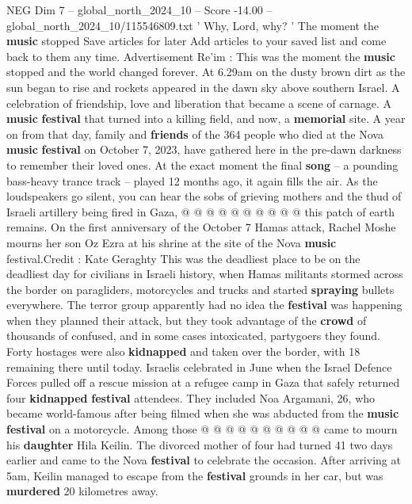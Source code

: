 \begin{textsample}{NEG Dim 7 – global\_north\_2024\_10 – Score -14.00 – global\_north\_2024\_10/115546809.txt}  \label{ex:f7_neg_031}
' Why, Lord, why? ' The moment the \textbf{music} stopped Save articles for later Add articles to your saved list and come back to them any time.
Advertisement Re'im : This was the moment the \textbf{music} stopped and the world changed forever.
At 6.29am on the dusty brown dirt as the sun began to rise and rockets appeared in the dawn sky above southern Israel.
A celebration of friendship, love and liberation that became a scene of carnage.
A \textbf{music} \textbf{festival} that turned into a killing field, and now, a \textbf{memorial} site.
A year on from that day, family and \textbf{friends} of the 364 people who died at the Nova \textbf{music} \textbf{festival} on October 7, 2023, have gathered here in the pre-dawn darkness to remember their loved ones.
At the exact moment the final \textbf{song} -- a pounding bass-heavy trance track -- played 12 months ago, it again fills the air.
As the loudspeakers go silent, you can hear the sobs of grieving mothers and the thud of Israeli artillery being fired in Gaza, @ @ @ @ @ @ @ @ @ @ this patch of earth remains.
On the first anniversary of the October 7 Hamas attack, Rachel Moshe mourns her son Oz Ezra at his shrine at the site of the Nova \textbf{music} festival.Credit : Kate Geraghty This was the deadliest place to be on the deadliest day for civilians in Israeli history, when Hamas militants stormed across the border on paragliders, motorcycles and trucks and started \textbf{spraying} bullets everywhere.
The terror group apparently had no idea the \textbf{festival} was happening when they planned their attack, but they took advantage of the \textbf{crowd} of thousands of confused, and in some cases intoxicated, partygoers they found.
Forty hostages were also \textbf{kidnapped} and taken over the border, with 18 remaining there until today.
Israelis celebrated in June when the Israel Defence Forces pulled off a rescue mission at a refugee camp in Gaza that safely returned four \textbf{kidnapped} \textbf{festival} attendees.
They included Noa Argamani, 26, who became world-famous after being filmed when she was abducted from the \textbf{music} \textbf{festival} on a motorcycle.
Among those @ @ @ @ @ @ @ @ @ @ came to mourn his \textbf{daughter} Hila Keilin.
The divorced mother of four had turned 41 two days earlier and came to the Nova \textbf{festival} to celebrate the occasion.
After arriving at 5am, Keilin managed to escape from the \textbf{festival} grounds in her car, but was \textbf{murdered} 20 kilometres away.

\end{textsample}
